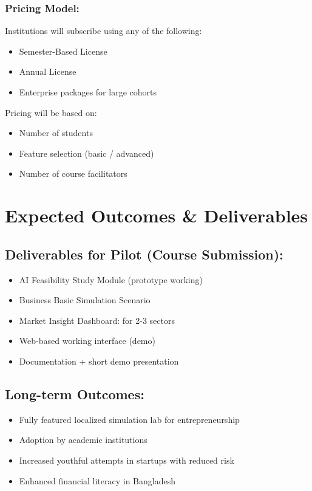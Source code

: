 \documentclass[12pt,letterpaper]{article}
\begin{document}
\subsubsection{Pricing Model:}
Institutions will subscribe using any of the following:
\begin{itemize}
    \item Semester-Based License
    \item Annual License
    \item Enterprise packages for large cohorts
\end{itemize}

Pricing will be based on:
\begin{itemize}
    \item Number of students
    \item Feature selection (basic / advanced)
    \item Number of course facilitators
\end{itemize}

\section{Expected Outcomes \& Deliverables}

\subsection{Deliverables for Pilot (Course Submission):}
\begin{itemize}
    \item AI Feasibility Study Module (prototype working)
    \item Business Basic Simulation Scenario
    \item Market Insight Dashboard: for 2-3 sectors
    \item Web-based working interface (demo)
    \item Documentation + short demo presentation
\end{itemize}

\subsection{Long-term Outcomes:}
\begin{itemize}
    \item Fully featured localized simulation lab for entrepreneurship
    \item Adoption by academic institutions
    \item Increased youthful attempts in startups with reduced risk
    \item Enhanced financial literacy in Bangladesh
\end{itemize}
\end{document}
